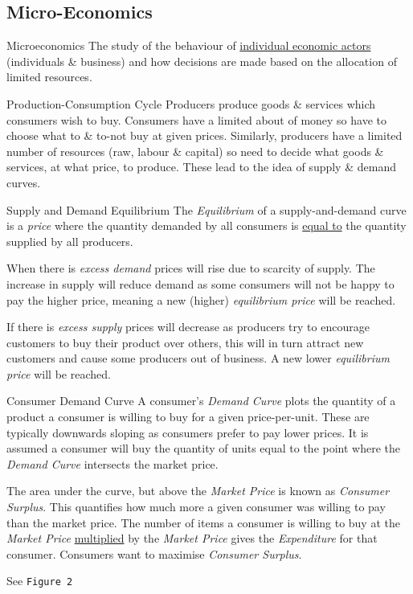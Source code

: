 \documentclass[11pt,a4paper]{article}
\begin{document}
\subsection{Micro-Economics}

\begin{definition}{Microeconomics}
  The study of the behaviour of \underline{individual economic actors} (individuals \& business) and how decisions are made based on the allocation of limited resources.
\end{definition}

\begin{definition}{Production-Consumption Cycle}
  Producers produce goods \& services which consumers wish to buy. Consumers have a limited about of money so have to choose what to \& to-not buy at given prices. Similarly, producers have a limited number of resources (raw, labour \& capital) so need to decide what goods \& services, at what price, to produce. These lead to the idea of supply \& demand curves.
\end{definition}

\begin{definition}{Supply and Demand Equilibrium}
  The \textit{Equilibrium} of a supply-and-demand curve is a \textit{price} where the quantity demanded by all consumers is \underline{equal to} the quantity supplied by all producers.
  \par When there is \textit{excess demand} prices will rise due to scarcity of supply. The increase in supply will reduce demand as some consumers will not be happy to pay the higher price, meaning a new (higher) \textit{equilibrium price} will be reached.
  \par If there is \textit{excess supply} prices will decrease as producers try to encourage customers to buy their product over others, this will in turn attract new customers and cause some producers out of business. A new lower \textit{equilibrium price} will be reached.
\end{definition}

\begin{definition}{Consumer Demand Curve}
  A consumer's \textit{Demand Curve} plots the quantity of a product a consumer is willing to buy for a given price-per-unit. These are typically downwards sloping as consumers prefer to pay lower prices. It is assumed a consumer will buy the quantity of units equal to the point where the \textit{Demand Curve} intersects the market price.

  \par The area under the curve, but above the \textit{Market Price} is known as \textit{Consumer Surplus}. This quantifies how much more a given consumer was willing to pay than the market price. The number of items a consumer is willing to buy at the \textit{Market Price} \underline{multiplied} by the \textit{Market Price} gives the \textit{Expenditure} for that consumer. Consumers want to maximise \textit{Consumer Surplus}.

  \par See \texttt{Figure 2}
\end{definition}
\end{document}
